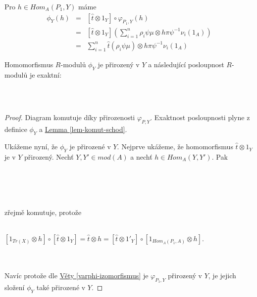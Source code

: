       \begin{pzn}
        Pro $h\in Hom_A(P_1,Y)$ máme        
        \begin{eqnarray}
          \phi_Y(h) &=& [\hat{t}\otimes 1_Y]\circ\varphi_{P_1,Y}(h) \nonumber \\
          &=& 
            [\hat{t}\otimes 1_Y] \left(  
              \sum_{i=1}^n\rho_i\psi\mu \otimes h\pi\psi^{-1}\nu_i(1_A)
            \right) \nonumber \\
          &=& \sum_{i=1}^n\hat{t}(\rho_i\psi\mu) \otimes h\pi\psi^{-1}\nu_i(1_A) \nonumber
        \end{eqnarray}
      \end{pzn}
      
      \begin{lem}\label{lem-exakt-radek-phi-Y}
        Homomorfismus $R$-modulů $\phi_Y$ je přirozený v $Y$ a následující 
        posloupnost $R$-modulů je exaktní: \\\\
      \centerline{}\\
      \end{lem}
      \begin{proof}
        Diagram komutuje díky přirozenosti $\varphi_{P,Y}$.
        Exaktnost posloupnosti plyne z definice $\phi_Y$ a \hyperref[lem-komut-schod]{Lemma 
        \ref*{lem-komut-schod}}.
        
        Ukážeme nyní, že $\phi_Y$ je přirozené v $Y$. Nejprve ukážeme, že 
        homomorfismus $\hat t\otimes 1_Y$ 
        je v $Y$ přirozený. Nechť $Y,Y'\in mod(A)$ a nechť $h\in Hom_A(Y,Y')$. 
        Pak \\\\
        \centerline{}\\\\\\
        zřejmě komutuje, protože \\\\
        \centerline{$
          [1_{Tr(X)}\otimes h]\circ [\hat t \otimes 1_Y]
          = \hat t \otimes h
          = [\hat t\otimes 1'_Y] \circ [1_{Hom_A(P_1,A)}\otimes h]
        $.} \\\\
        Navíc protože dle \hyperref[varphi-izomorfismus]{Věty \ref*{varphi-izomorfismus}} 
        je $\varphi_{P_1, Y}$ přirozený v $Y$, je jejich složení $\phi_Y$ také 
        přirozené v $Y$.        
      \end{proof}
      
